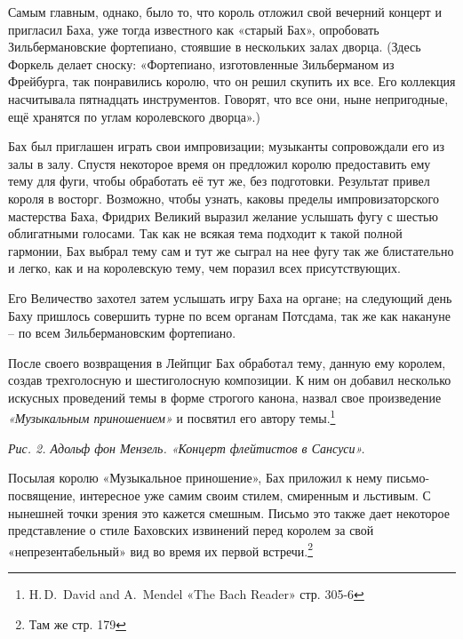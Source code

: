 \documentclass[../main.tex]{subfiles}
\begin{document}
Самым главным, однако, было то, что король отложил свой вечерний концерт и пригласил Баха, уже тогда известного как «старый Бах», опробовать Зильбермановские фортепиано, стоявшие в нескольких залах дворца. (Здесь Форкель делает сноску: «Фортепиано, изготовленные Зильберманом из Фрейбурга, так понравились королю, что он решил скупить их все. Его коллекция насчитывала пятнадцать инструментов. Говорят, что все они, ныне непригодные, ещё хранятся по углам королевского дворца».)

Бах был приглашен играть свои импровизации; музыканты сопровождали его из залы в залу. Спустя некоторое время он предложил королю предоставить ему тему для фуги, чтобы обработать её тут же, без подготовки. Результат привел короля в восторг. Возможно, чтобы узнать, каковы пределы импровизаторского мастерства Баха, Фридрих Великий выразил желание услышать фугу с шестью облигатными голосами. Так как не всякая тема подходит к такой полной гармонии, Бах выбрал тему сам и тут же сыграл на нее фугу так же блистательно и легко, как и на королевскую тему, чем поразил всех присутствующих.

Его Величество захотел затем услышать игру Баха на органе; на следующий день Баху пришлось совершить турне по всем органам Потсдама, так же как накануне \--- по всем Зильбермановским фортепиано.

После своего возвращения в Лейпциг Бах обработал тему, данную ему королем, создав трехголосную и шестиголосную композиции. К ним он добавил несколько искусных проведений темы в форме строгого канона, назвал свое произведение \emph{«Музыкальным приношением»} и посвятил его автору темы.\footnote{H.\,D.~David and A.~Mendel «The Bach Reader» стр. 305-6}

\emph{Рис. 2. Адольф фон Мензель. «Концерт флейтистов в Сансуси».}


Посылая королю «Музыкальное приношение», Бах приложил к нему письмо-посвящение, интересное уже самим своим стилем, смиренным и льстивым. С нынешней точки зрения это кажется смешным. Письмо это также дает некоторое представление о стиле Баховских извинений перед королем за свой «непрезентабельный» вид во время их первой встречи.\footnote{Там же стр. 179}
\end{document}
